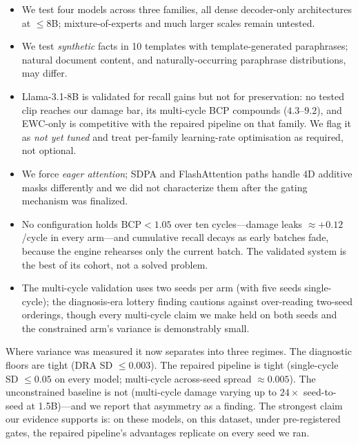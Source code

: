 \begin{itemize}[leftmargin=2.4em,itemsep=0.15em,topsep=0.2em]
    \item[(i)] We test four models across three families, all dense decoder-only architectures at $\leq$8B; mixture-of-experts and much larger scales remain untested.
    \item[(ii)] We test \emph{synthetic} facts in 10 templates with template-generated paraphrases; natural document content, and naturally-occurring paraphrase distributions, may differ.
    \item[(iii)] Llama-3.1-8B is validated for recall gains but not for preservation: no tested clip reaches our damage bar, its multi-cycle BCP compounds ($4.3$--$9.2$), and EWC-only is competitive with the repaired pipeline on that family. We flag it as \emph{not yet tuned} and treat per-family learning-rate optimisation as required, not optional.
    \item[(iv)] We force \emph{eager attention}; SDPA and FlashAttention paths handle 4D additive masks differently and we did not characterize them after the gating mechanism was finalized.
    \item[(v)] No configuration holds $\mathrm{BCP}<1.05$ over ten cycles---damage leaks $\approx +0.12$/cycle in every arm---and cumulative recall decays as early batches fade, because the engine rehearses only the current batch. The validated system is the best of its cohort, not a solved problem.
    \item[(vi)] The multi-cycle validation uses two seeds per arm (with five seeds single-cycle); the diagnosis-era lottery finding cautions against over-reading two-seed orderings, though every multi-cycle claim we make held on both seeds and the constrained arm's variance is demonstrably small.
\end{itemize}

Where variance was measured it now separates into three regimes. The diagnostic floors are tight (DRA SD $\leq 0.003$). The repaired pipeline is tight (single-cycle SD $\leq 0.05$ on every model; multi-cycle across-seed spread $\approx 0.005$). The unconstrained baseline is not (multi-cycle damage varying up to $24\times$ seed-to-seed at 1.5B)---and we report that asymmetry as a finding. The strongest claim our evidence supports is: on these models, on this dataset, under pre-registered gates, the repaired pipeline's advantages replicate on every seed we ran.

